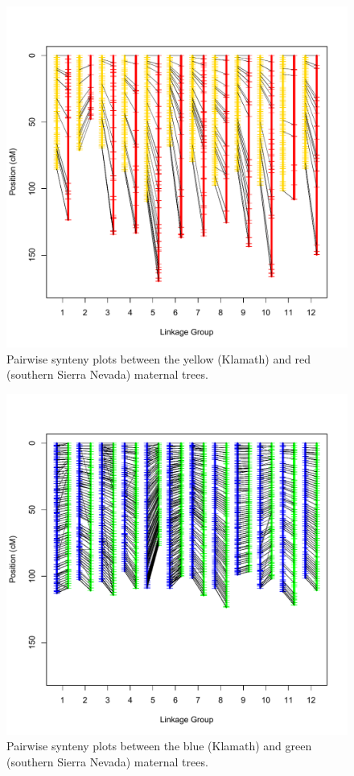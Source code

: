 \documentclass[smallextended]{svjour3}
\begin{document}
\begin{figure}[ht]
  \centering
  \includegraphics[width=\textwidth]{yellow_red_synteny}
  \caption{Pairwise synteny plots between the yellow (Klamath) and red (southern
    Sierra Nevada) maternal trees.}
  \label{f:con}
\end{figure}

\begin{figure}[ht]
  \centering
  \includegraphics[width=\textwidth]{blue_green_synteny}
  \caption{Pairwise synteny plots between the blue (Klamath) and green (southern
    Sierra Nevada) maternal trees.}
\end{figure}
\end{document}
